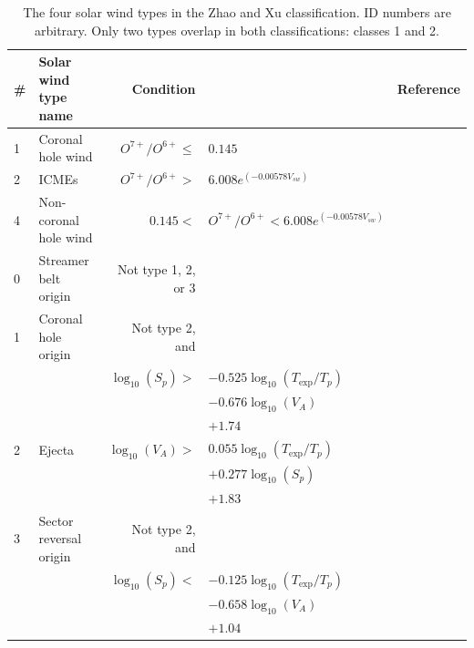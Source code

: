 \documentclass[utf8]{frontiersSCNS} %
\begin{document}
\begin{table}\centering
	\begin{tabular}{@{}llrll@{}}
		\toprule
		\# & Solar wind type name & Condition & & Reference \\
		\midrule
		1 & Coronal hole wind & $O^{7+}/O^{6+}\leq$&$0.145$ & \citep{Zhao2009} \\
		2 & ICMEs & $O^{7+}/O^{6+}>$&$6.008e^{(-0.00578V_{sw})}$ & \\
		4 & Non-coronal hole wind & $0.145<$&$ O^{7+}/O^{6+} < 6.008e^{(-0.00578V_{sw})} $ & \\
		\midrule
		0 & Streamer belt origin & Not type 1, 2, or 3 & & \citep{Xu2015b} \\
		1 & Coronal hole origin & Not type 2, and & & \\
		  &  & $\log_{10}(S_p)>$&$ -0.525 \log_{10}(T_{\text{exp}}/T_p)$\\
		  &  & &$- 0.676\log_{10}(V_A)$ \\
		  &  & &$+ 1.74$ & \\
		2 & Ejecta & $\log_{10}(V_A)>$ & $ 0.055\log_{10}(T_{\text{exp}}/T_p)$ \\
		  &  & & $+ 0.277 \log_{10}(S_p)$ \\
		  &  & & $+ 1.83$ & \\
		3 & Sector reversal origin & Not type 2, and & & \\
		  & & $\log_{10}(S_p)<$&$ -0.125 \log_{10}(T_{\text{exp}}/T_p)$ \\
		  & & & $- 0.658\log_{10}(V_A)$ \\
		  & & & $+ 1.04$ &  \\
		\bottomrule
	\end{tabular}
	\caption{The four solar wind types in the Zhao and Xu classification. ID numbers are arbitrary. Only two types overlap in both classifications: classes 1 and 2.}
	\label{tab:swtypes}
\end{table}
\end{document}
